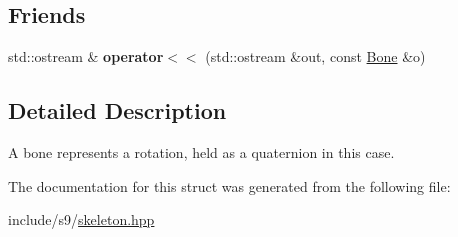 \subsection*{Friends}
\begin{DoxyCompactItemize}
\item 
\hypertarget{structs9_1_1Bone_aa8d6a718a954c2c1f9ac5001480a2667}{std\-::ostream \& {\bfseries operator$<$$<$} (std\-::ostream \&out, const \hyperlink{structs9_1_1Bone}{Bone} \&o)}\label{structs9_1_1Bone_aa8d6a718a954c2c1f9ac5001480a2667}

\end{DoxyCompactItemize}


\subsection{Detailed Description}
A bone represents a rotation, held as a quaternion in this case. 

The documentation for this struct was generated from the following file\-:\begin{DoxyCompactItemize}
\item 
include/s9/\hyperlink{skeleton_8hpp}{skeleton.\-hpp}\end{DoxyCompactItemize}
